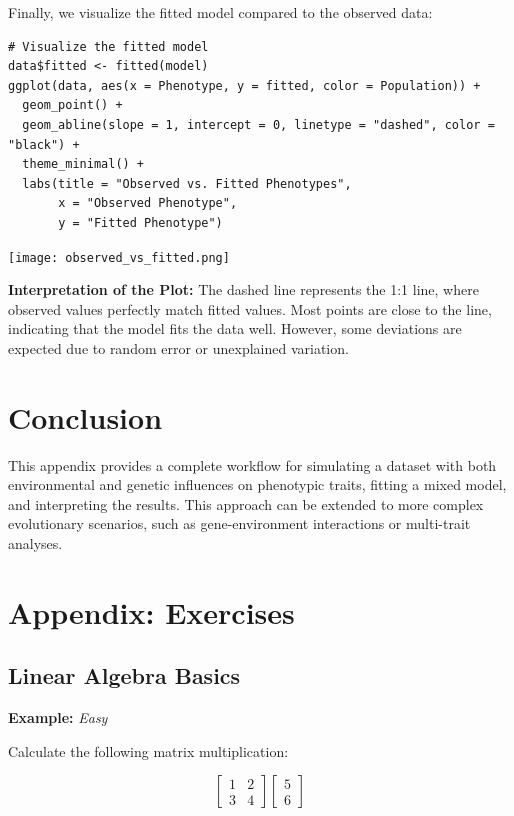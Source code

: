 \documentclass[12pt,a4paper]{article}
\newenvironment{example}[1][]
{\begin{basebox}[linecolor=uqgold]
\textbf{\color{uqgold}Example:} \textit{#1}\par\noindent\ignorespaces}
{\end{basebox}}
\begin{document}
Finally, we visualize the fitted model compared to the observed data:

\begin{verbatim}
# Visualize the fitted model
data$fitted <- fitted(model)
ggplot(data, aes(x = Phenotype, y = fitted, color = Population)) +
  geom_point() +
  geom_abline(slope = 1, intercept = 0, linetype = "dashed", color = "black") +
  theme_minimal() +
  labs(title = "Observed vs. Fitted Phenotypes",
       x = "Observed Phenotype",
       y = "Fitted Phenotype")
\end{verbatim}

\begin{center}
\texttt{[image: observed\_vs\_fitted.png]}
\end{center}

\textbf{Interpretation of the Plot:} The dashed line represents the 1:1 line, where observed values perfectly match fitted values. Most points are close to the line, indicating that the model fits the data well. However, some deviations are expected due to random error or unexplained variation.

\section{Conclusion}

This appendix provides a complete workflow for simulating a dataset with both environmental and genetic influences on phenotypic traits, fitting a mixed model, and interpreting the results. This approach can be extended to more complex evolutionary scenarios, such as gene-environment interactions or multi-trait analyses.

\section{Appendix: Exercises}

\subsection{Linear Algebra Basics}

\begin{example}[Easy]
Calculate the following matrix multiplication:

\[
\begin{bmatrix}
1 & 2 \\
3 & 4
\end{bmatrix}
\begin{bmatrix}
5 \\
6
\end{bmatrix}
\]
\end{example}
\end{document}

